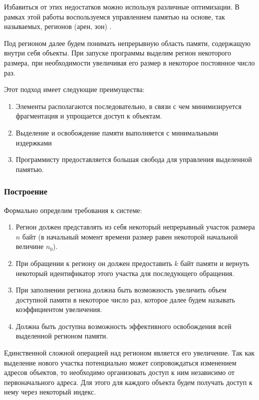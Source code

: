 \documentclass[coursework]{SCWorks}
\begin{document}
Избавиться от этих недостатков можно используя различные оптимизации. В рамках 
этой работы воспользуемся управлением памятью на основе, так называемых, 
регионов (арен, зон) \cite{Wang}.

Под регионом далее будем понимать непрерывную область памяти, содержащую внутри 
себя объекты. При запуске программы выделим регион некоторого размера, при 
необходимости увеличивая его размер в некоторое постоянное
число раз.

Этот подход имеет следующие преимущества:
\begin{enumerate}
    \item Элементы располагаются последовательно, в связи с чем минимизируется
    фрагментация и упрощается доступ к объектам.
    \item Выделение и освобождение памяти выполняется с минимальными издержками
    \item Программисту предоставляется большая свобода для управления выделенной
    памятью.
\end{enumerate}

\subsubsection{Построение}
Формально определим требования к системе:
\begin{enumerate}
    \item Регион должен представлять из себя некоторый непрерывный участок 
    размера $n$ байт (в начальный момент времени размер равен некоторой 
    начальной величине $n_0$).
    \item При обращении к региону он должен предоставить $k$ байт памяти и 
    вернуть некоторый идентификатор этого участка для последующего обращения.
    \item При заполнении региона должна быть возможность увеличить объем 
    доступной памяти в некоторое число раз, которое далее будем называть
    коэффициентом увеличения.
    \item Должна быть доступна возможность эффективного освобождения всей 
    выделенной регионом памяти.
\end{enumerate}

Единственной сложной операцией над регионом является его увеличение.
Так как выделение нового участка потенциально может сопровождаться изменением 
адресов объектов, то необходимо организовать доступ к ним независимо от 
первоначального адреса. Для этого для каждого объекта будем получать доступ к 
нему через некоторый индекс. 
\end{document}
